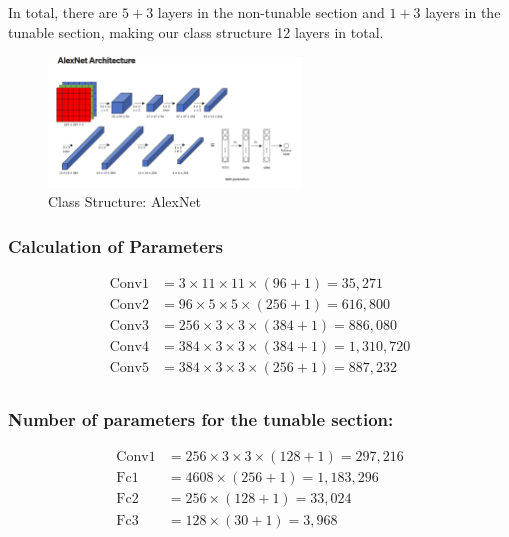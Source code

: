 \documentclass{article} %
\begin{document}
In total, there are $5+3$ layers in the non-tunable section and $1+3$ layers in the tunable section, making our class structure 12 layers in total.
  
\begin{figure}[h]
    \begin{center}
    \includegraphics[width=0.6\textwidth]{figures/AlexNetStructure.png}
    \end{center}
    \caption{Class Structure: AlexNet \citep{Bangar.AlexNetArchitectureExplained.2022}}
\end{figure}

\subsubsection{Calculation of Parameters}

\begin{align*}
\text{Conv1} & = 3 \times 11 \times 11 \times (96 + 1) = 35,271 \\
\text{Conv2} & = 96 \times 5 \times 5 \times (256 + 1) = 616,800 \\
\text{Conv3} & = 256 \times 3 \times 3 \times (384 + 1) = 886,080 \\
\text{Conv4} & = 384 \times 3 \times 3 \times (384 + 1) = 1,310,720 \\
\text{Conv5} & = 384 \times 3 \times 3 \times (256 + 1) = 887,232 \\
\end{align*}

\subsubsection{Number of parameters for the tunable section:}
\begin{align*}
\text{Conv1} & = 256 \times 3 \times 3 \times (128 + 1) = 297,216 \\
\text{Fc1} & = 4608 \times (256 + 1) = 1,183,296 \\
\text{Fc2} & = 256 \times (128 + 1) = 33,024 \\
\text{Fc3} & = 128 \times (30 + 1) = 3,968 \\
\end{align*}
\end{document}
